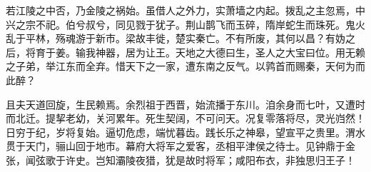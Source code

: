若江陵之中否，乃金陵之祸始。虽借人之外力，实萧墙之内起。拨乱之主忽焉，中兴之宗不祀。伯兮叔兮，同见戮于犹子。荆山鹊飞而玉碎，隋岸蛇生而珠死。鬼火乱于平林，殇魂游于新市。梁故丰徙，楚实秦亡。不有所废，其何以昌？有妫之后，将育于姜。输我神器，居为让王。天地之大德曰生，圣人之大宝曰位。用无赖之子弟，举江东而全弃。惜天下之一家，遭东南之反气。以鹑首而赐秦，天何为而此醉？

且夫天道回旋，生民赖焉。余烈祖于西晋，始流播于东川。洎余身而七叶，又遭时而北迁。提挈老幼，关河累年。死生契阔，不可问天。况复零落将尽，灵光岿然！日穷于纪，岁将复始。逼切危虑，端忧暮齿。践长乐之神皋，望宣平之贵里。渭水贯于天门，骊山回于地市。幕府大将军之爱客，丞相平津侯之待士。见钟鼎于金张，闻弦歌于许史。岂知灞陵夜猎，犹是故时将军；咸阳布衣，非独思归王子！
